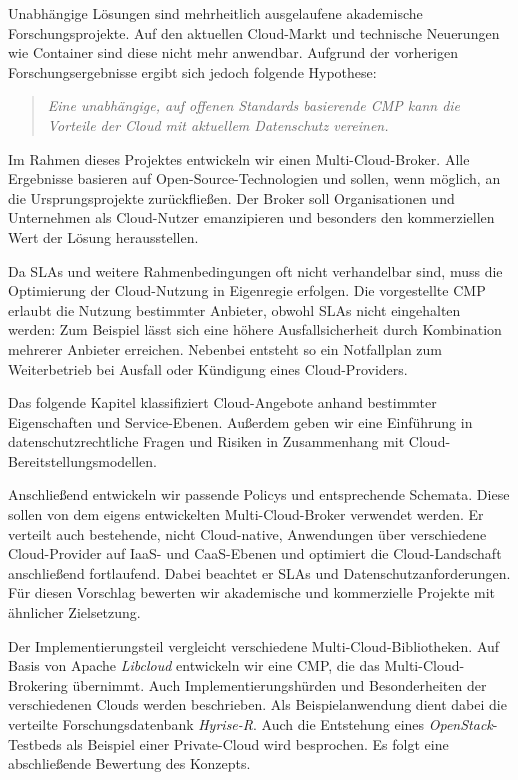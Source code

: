 Unabhängige Lösungen sind mehrheitlich ausgelaufene akademische Forschungsprojekte. Auf den aktuellen Cloud-Markt und technische Neuerungen wie Container sind diese nicht mehr anwendbar. Aufgrund der vorherigen Forschungsergebnisse ergibt sich jedoch folgende Hypothese:

\begin{verse}
	{\emph{Eine unabhängige, auf offenen Standards basierende CMP kann die \newline Vorteile der Cloud mit aktuellem Datenschutz vereinen.}}
\end{verse}

Im Rahmen dieses Projektes entwickeln wir einen Multi-Cloud-Broker. Alle Ergebnisse basieren auf Open-Source-Technologien und sollen, wenn möglich, an die Ursprungsprojekte zurückfließen. Der Broker soll Organisationen und Unternehmen als Cloud-Nutzer emanzipieren und besonders den kommerziellen Wert der Lösung herausstellen.

Da SLAs und weitere Rahmenbedingungen oft nicht verhandelbar sind, muss die Optimierung der Cloud-Nutzung in Eigenregie erfolgen.  Die vorgestellte CMP erlaubt die Nutzung bestimmter Anbieter, obwohl SLAs  nicht eingehalten werden: Zum Beispiel lässt sich eine höhere Ausfallsicherheit durch Kombination mehrerer Anbieter erreichen. Nebenbei entsteht so ein Notfallplan zum Weiterbetrieb bei Ausfall oder Kündigung eines Cloud-Providers.

Das folgende Kapitel klassifiziert Cloud-Angebote anhand bestimmter Eigenschaften und Service-Ebenen. Außerdem geben wir eine Einführung in datenschutzrechtliche Fragen und Risiken in Zusammenhang mit Cloud-Bereit\-stel\-lungs\-model\-len.

Anschließend entwickeln wir passende Policys und entsprechende Schemata. Diese sollen von dem eigens entwickelten Multi-Cloud-Broker verwendet werden. Er verteilt auch bestehende, nicht Cloud-native, Anwendungen über verschiedene Cloud-Provider auf IaaS- und CaaS-Ebenen und optimiert die Cloud-Landschaft anschließend fortlaufend. Dabei beachtet er SLAs und Datenschutzanforderungen. Für diesen Vorschlag bewerten wir akademische und kommerzielle Projekte mit ähnlicher Zielsetzung.

Der Implementierungsteil vergleicht verschiedene Multi-Cloud-Bibliotheken. Auf Basis von Apache \emph{Libcloud} entwickeln wir eine CMP, die das Multi-Cloud-Brokering übernimmt. Auch Implementierungshürden und Besonderheiten der verschiedenen Clouds werden beschrieben. Als Beispielanwendung dient dabei die verteilte Forschungsdatenbank \emph{Hyrise-R}. Auch die Entstehung eines \emph{OpenStack}-Testbeds als Beispiel einer Private-Cloud wird besprochen. Es folgt eine abschließende Bewertung des Konzepts.
